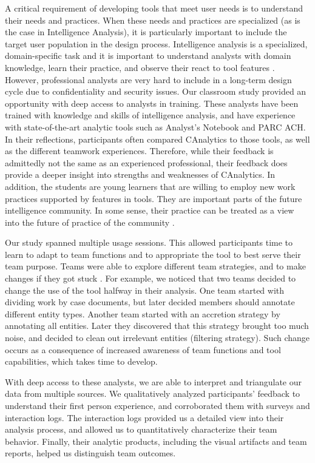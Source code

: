 A critical requirement of developing tools that meet user needs is to 
understand their needs and practices. When these needs and practices
are specialized (as is the case in Intelligence Analysis), it is 
particularly important to include the target user population in 
the design process. Intelligence analysis is a specialized,
 domain-specific task and it is important to understand analysts with domain knowledge, 
 learn their practice, and observe their react to tool features \cite{Scholtz2014}. 
 However, professional analysts are very hard to include 
 in a long-term design cycle due to confidentiality and security 
 issues. Our classroom study provided an opportunity with deep 
 access to analysts in training. These analysts have been trained 
 with knowledge and skills of intelligence analysis, and have experience with state-of-the-art analytic
tools such as Analyst's Notebook and PARC ACH. In their reflections, participants often compared CAnalytics to
those tools, as well as the different teamwork experiences. Therefore, while their feedback is
admittedly not the same as an experienced professional,
their feedback does provide a deeper insight into strengths and
weaknesses of CAnalytics. In addition, the students are young learners
that are willing to employ new work practices supported by features in
tools. They are important parts of the future intelligence community. In
some sense, their practice can be treated as a view into the future of
practice of the community \cite{Martin2014}.

Our study spanned multiple usage sessions.
This allowed participants time to learn to adapt to team functions and to appropriate
the tool to best serve their team purpose. Teams were able to explore different team strategies, and to
make changes if they got stuck \cite{Stahl2006}. For example, we
noticed that two teams decided to change the use of the tool halfway in
their analysis. One team started with dividing work by case documents,
but later decided members should annotate different entity types.
Another team started with an accretion strategy by annotating all
entities. Later they discovered that this strategy brought too much
noise, and decided to clean out irrelevant entities (filtering
strategy). Such change occurs as a consequence of increased awareness of
team functions and tool capabilities, which takes time to develop.

With deep access to these analysts, we are able to interpret and triangulate our data from multiple sources. We qualitatively analyzed participants' feedback to understand their first person experience, and corroborated them with surveys and interaction logs. The interaction logs provided us a detailed view into their analysis process, and allowed us to quantitatively characterize their team behavior. Finally, their analytic products, including the visual artifacts and team reports, helped us distinguish team outcomes.

